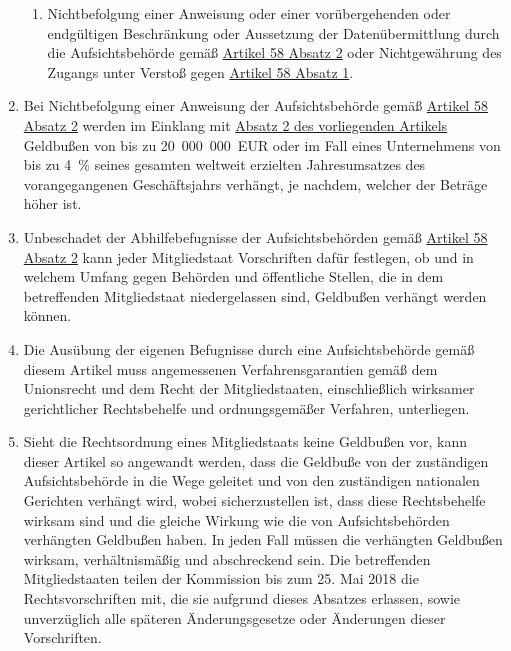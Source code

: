 \begin{enumerate}
\begin{enumerate}
    \item Nichtbefolgung einer Anweisung oder einer vorübergehenden oder endgültigen Beschränkung oder Aussetzung der
     Datenübermittlung durch die Aufsichtsbehörde gemäß \hyperref[itm:58-2]{Artikel 58 Absatz 2} oder Nichtgewährung
     des Zugangs unter Verstoß gegen \hyperref[itm:58-1]{Artikel 58 Absatz 1}.
    \label{itm:83-5e}

  \end{enumerate}

  \item Bei Nichtbefolgung einer Anweisung der Aufsichtsbehörde gemäß \hyperref[itm:58-2]{Artikel 58 Absatz 2} werden im
   Einklang mit \hyperref[itm:83-2]{Absatz 2 des vorliegenden Artikels} Geldbußen von bis zu 20~000~000~EUR oder im
   Fall eines Unternehmens von bis zu 4~\% seines gesamten weltweit erzielten Jahresumsatzes des vorangegangenen
   Geschäftsjahrs verhängt, je nachdem, welcher der Beträge höher ist.
  \label{itm:83-6}

  \item Unbeschadet der Abhilfebefugnisse der Aufsichtsbehörden gemäß \hyperref[itm:58-2]{Artikel 58 Absatz 2} kann
   jeder Mitgliedstaat Vorschriften dafür festlegen, ob und in welchem Umfang gegen Behörden und öffentliche Stellen,
   die in dem betreffenden Mitgliedstaat niedergelassen sind, Geldbußen verhängt werden können.
  \label{itm:83-7}

  \item Die Ausübung der eigenen Befugnisse durch eine Aufsichtsbehörde gemäß diesem Artikel muss angemessenen
   Verfahrensgarantien gemäß dem Unionsrecht und dem Recht der Mitgliedstaaten, einschließlich wirksamer gerichtlicher
   Rechtsbehelfe und ordnungsgemäßer Verfahren, unterliegen.
  \label{itm:83-8}

  \item Sieht die Rechtsordnung eines Mitgliedstaats keine Geldbußen vor, kann dieser Artikel so angewandt werden, dass
   die Geldbuße von der zuständigen Aufsichtsbehörde in die Wege geleitet und von den zuständigen nationalen Gerichten
   verhängt wird, wobei sicherzustellen ist, dass diese Rechtsbehelfe wirksam sind und die gleiche Wirkung wie die von
   Aufsichtsbehörden verhängten Geldbußen haben. In jeden Fall müssen die verhängten Geldbußen wirksam, verhältnismäßig
   und abschreckend sein. Die betreffenden Mitgliedstaaten teilen der Kommission bis zum 25. Mai 2018 die
   Rechtsvorschriften mit, die sie aufgrund dieses Absatzes erlassen, sowie unverzüglich alle späteren Änderungsgesetze
   oder Änderungen dieser Vorschriften.

\end{enumerate}


